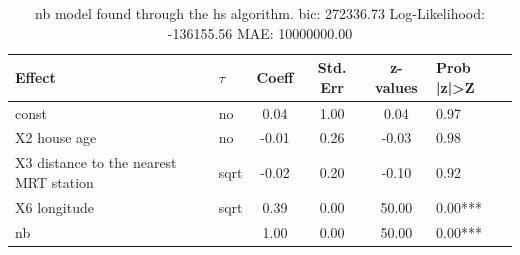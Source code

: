 \begin{table}
	\caption{nb model found through the hs algorithm. bic: 272336.73 Log-Likelihood: -136155.56 MAE: 10000000.00}
	\begin{center}
		\begin{tabular}{|l|l|c|c|c|l|}
			\hline
			Effect & $\tau$ & Coeff & Std. Err & z-values & Prob |z|>Z \\
			\hline
			const & no & 0.04 & 1.00 & 0.04 & 0.97 \\
			\hline
			X2 house age & no & -0.01 & 0.26 & -0.03 & 0.98 \\
			\hline
			X3 distance to the nearest MRT station & sqrt & -0.02 & 0.20 & -0.10 & 0.92 \\
			\hline
			X6 longitude & sqrt & 0.39 & 0.00 & 50.00 & 0.00*** \\
			\hline
			nb &  & 1.00 & 0.00 & 50.00 & 0.00*** \\
			\hline
		\end{tabular}
	\end{center}
\end{table}